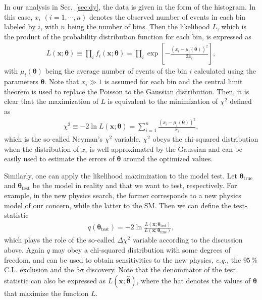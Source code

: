\documentclass[12pt,twoside,book]{article}
\begin{document}
In our analysis in Sec.~\ref{sec:dy}, the data is given in the form of the histogram.
In this case, $x_i$ $(i=1, \cdots, n)$ denotes the observed number of events in each bin labeled by $i$, with $n$ being the number of bins.
Then the likelihood $L$, which is the product of the probability distribution function for each bin, is expressed as
\begin{align}
  L(\bm{x} ; \bm{\theta}) \equiv \prod_i f_i(\bm{x} ; \bm{\theta}) = \prod_i \exp \left[
    - \frac{\left(x_i - \mu_i (\bm{\theta}) \right)^2}{2 x_i}
  \right],
\end{align}
with $\mu_i (\bm{\theta})$ being the average number of events of the bin $i$ calculated using the parameters $\bm{\theta}$.
Note that $x_i \gg 1$ is assumed for each bin and the central limit theorem is used to replace the Poisson to the Gaussian distribution.
Then, it is clear that the maximization of $L$ is equivalent to the minimization of $\chi^2$ defined as
\begin{align}
  \chi^2 \equiv -2 \ln L(\bm{x} ; \bm{\theta}) = \sum_{i=1}^{n}
  \frac{\left(x_i - \mu_i (\bm{\theta}) \right)^2}{x_i},
\end{align}
which is the so-called Neyman's $\chi^2$ variable.
$\chi^2$ obeys the chi-squared distribution when the distribution of $x_i$ is well approximated by the Gaussian and can be easily used to estimate the errors of $\bm{\theta}$ around the optimized values.

Similarly, one can apply the likelihood maximization to the model test.
Let $\bm{\theta}_{\mathrm{true}}$ and $\bm{\theta}_{\mathrm{test}}$ be the model in reality and that we want to test, respectively.
For example, in the new physics search, the former corresponds to a new physics model of our concern, while the latter to the SM.
Then we can define the test-statistic
\begin{align}
  q (\bm{\theta}_{\mathrm{test}}) =
  -2 \ln \frac{L(\bm{x} ; \bm{\theta}_{\mathrm{test}})}
  {L(\bm{x} ; \bm{\theta}_{\mathrm{true}})},
\end{align}
which plays the role of the so-called $\Delta \chi^2$ variable according to the discussion above.
Again $q$ may obey a chi-squared distribution with some degrees of freedom, and can be used to obtain sensitivities to the new physics, \textit{e.g.,} the $95\,\%$ C.L. exclusion and the $5\sigma$ discovery.
Note that the denominator of the test statistic can also be expressed as $L(\bm{x} ; \hat{\bm{\theta}})$, where the hat denotes the values of $\bm{\theta}$ that maximize the function $L$.
\end{document}

